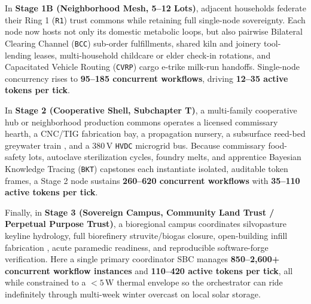 In \textbf{Stage 1B (Neighborhood Mesh, 5--12 Lots)}, adjacent households federate their Ring 1
(\texttt{R1}) trust commons while retaining full single-node sovereignty. Each node now hosts not only its
domestic metabolic loops, but also pairwise Bilateral Clearing Channel (\texttt{BCC}) sub-order
fulfillments, shared kiln and joinery tool-lending leases, multi-household childcare or elder check-in
rotations, and Capacitated Vehicle Routing (\texttt{CVRP}) cargo e-trike milk-run handoffs. Single-node
concurrency rises to \textbf{95--185 concurrent workflows}, driving \textbf{12--35 active tokens per
tick}.

In \textbf{Stage 2 (Cooperative Shell, Subchapter T)}, a multi-family cooperative hub or neighborhood
production commons operates a licensed commissary hearth, a CNC/TIG fabrication bay, a propagation
nursery, a subsurface reed-bed greywater train \parencite{kadlec1996}, and a $380\,\mathrm{V}$
\texttt{HVDC} microgrid bus. Because commissary food-safety lots, autoclave sterilization cycles, foundry
melts, and apprentice Bayesian Knowledge Tracing (\texttt{BKT}) capstones \parencite{corbett1995bkt} each
instantiate isolated, auditable token frames, a Stage 2 node sustains \textbf{260--620 concurrent
workflows} with \textbf{35--110 active tokens per tick}.

Finally, in \textbf{Stage 3 (Sovereign Campus, Community Land Trust / Perpetual Purpose Trust)}, a
bioregional campus coordinates silvopasture keyline hydrology, full biorefinery struvite/biogas closure,
open-building infill fabrication \parencite{habraken1972supports}, acute paramedic readiness, and
reproducible software-forge verification. Here a single primary coordinator SBC manages
\textbf{850--2,600+ concurrent workflow instances} and \textbf{110--420 active tokens per tick}, all while
constrained to a $< 5\,\mathrm{W}$ thermal envelope so the orchestrator can ride indefinitely through
multi-week winter overcast on local solar storage.

